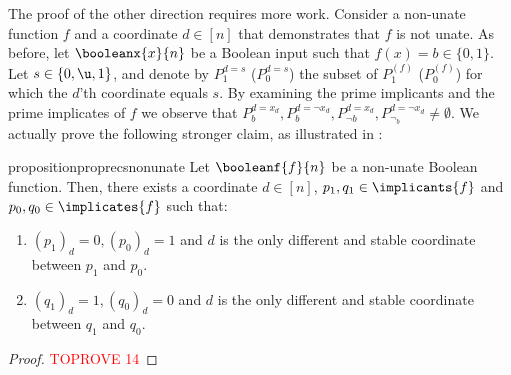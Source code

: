 \documentclass[acmsmall, nonacm, authorversion]{acmart}
\begin{document}
The proof of the other direction requires more work. Consider a non-unate function $f$ and a coordinate $d\in [n]$ that demonstrates that $f$ is not unate. As before, let $\booleanx{x}{n}$ be a Boolean input such that $f(x)=b\in\{0,1\}$. 
Let $s\in\{0,\u,1\}$, and denote by $P_1^{d=s}$ ($P_0^{d=s}$) the subset of $P_1^{(f)}$ ($P_0^{(f)}$) for which the $d$'th coordinate equals $s$. By examining the prime implicants and the prime implicates of $f$ we observe that $P_{b}^{d=x_d},P_{b}^{d=\neg x_d},P_{\neg b}^{d=x_d},P_{\neg_b}^{d=\neg x_d}\neq \emptyset$. 
We actually prove the following stronger claim, as illustrated in :

\begin{restatable}{proposition}{proprecsnonunate}\label{prop:recs-non-unate}
Let $\booleanf{f}{n}$ be a non-unate Boolean function. Then, there exists a coordinate $d\in[n]$, $p_1,q_1\in \implicants{f}$ and $p_0,q_0\in \implicates{f}$ such that:
\begin{enumerate}
    \item $(p_1)_d=0,(p_0)_d=1$ and $d$ is the only different and stable coordinate between $p_1$ and $p_0$.
    \item $(q_1)_d=1,(q_0)_d=0$ and $d$ is the only different and stable coordinate between $q_1$ and $q_0$.
\end{enumerate} 
\end{restatable}
\begin{proof}\textcolor{red}{TOPROVE 14}\end{proof}
\end{document}
